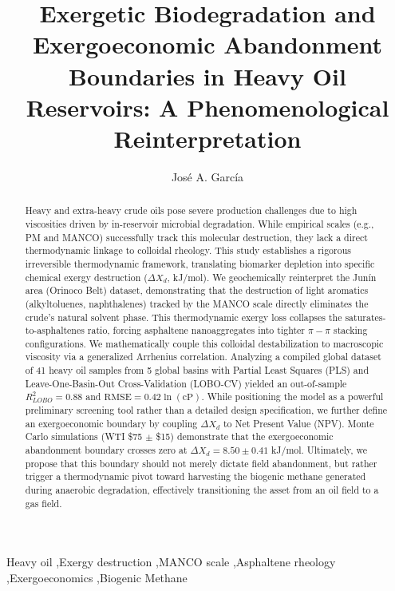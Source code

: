 \documentclass[review,12pt]{elsarticle}
\begin{document}
\begin{frontmatter}

\title{Exergetic Biodegradation and Exergoeconomic Abandonment Boundaries in Heavy Oil Reservoirs: A Phenomenological Reinterpretation}

\author[1]{Jos\'e A. Garc\'ia}

\address[1]{Instituto de Ciencias de la Tierra, Facultad de Ciencias, Universidad Central de Venezuela, Caracas 1010A, Venezuela}

\begin{abstract}
Heavy and extra-heavy crude oils pose severe production challenges due to high viscosities driven by in-reservoir microbial degradation. While empirical scales (e.g., PM and MANCO) successfully track this molecular destruction, they lack a direct thermodynamic linkage to colloidal rheology. This study establishes a rigorous irreversible thermodynamic framework, translating biomarker depletion into specific chemical exergy destruction ($\Delta X_d$, kJ/mol). We geochemically reinterpret the Jun\'in area (Orinoco Belt) dataset, demonstrating that the destruction of light aromatics (alkyltoluenes, naphthalenes) tracked by the MANCO scale directly eliminates the crude's natural solvent phase. This thermodynamic exergy loss collapses the saturates-to-asphaltenes ratio, forcing asphaltene nanoaggregates into tighter $\pi-\pi$ stacking configurations. We mathematically couple this colloidal destabilization to macroscopic viscosity via a generalized Arrhenius correlation. Analyzing a compiled global dataset of 41 heavy oil samples from 5 global basins with Partial Least Squares (PLS) and Leave-One-Basin-Out Cross-Validation (LOBO-CV) yielded an out-of-sample $R^2_{LOBO} = 0.88$ and $\text{RMSE} = 0.42 \ln(\text{cP})$. While positioning the model as a powerful preliminary screening tool rather than a detailed design specification, we further define an exergoeconomic boundary by coupling $\Delta X_d$ to Net Present Value (NPV). Monte Carlo simulations (WTI \$75 $\pm$ \$15) demonstrate that the exergoeconomic abandonment boundary crosses zero at $\Delta X_d = 8.50 \pm 0.41$ kJ/mol. Ultimately, we propose that this boundary should not merely dictate field abandonment, but rather trigger a thermodynamic pivot toward harvesting the biogenic methane generated during anaerobic degradation, effectively transitioning the asset from an oil field to a gas field.
\end{abstract}

\begin{keyword}
Heavy oil \sep Exergy destruction \sep MANCO scale \sep Asphaltene rheology \sep Exergoeconomics \sep Biogenic Methane
\end{keyword}

\end{frontmatter}
\end{document}
